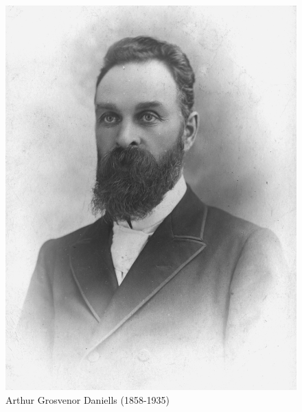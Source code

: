 \begin{figure}[hp]
    \centering
    \includegraphics[width=1\linewidth]{images/daniels.jpg}
    \caption*{Arthur Grosvenor Daniells (1858-1935)}
    \label{fig:daniells}
\end{figure}


